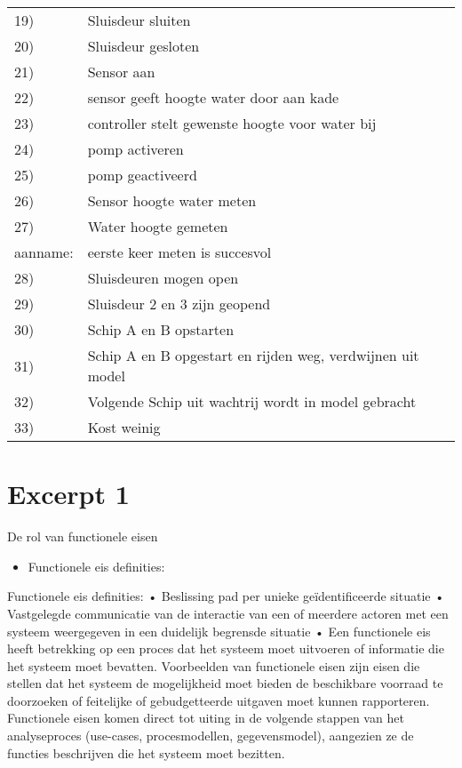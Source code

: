 \documentclass[a4paper,12pt]{article}
\begin{document}
\begin{table}[hbt!]
\begin{center}
\begin{tabular}{llc}
19) & Sluisdeur sluiten & \\
20) & Sluisdeur gesloten & \\
21) & Sensor aan & \\
22) & sensor geeft hoogte water door aan kade & \\
23) & controller stelt gewenste hoogte voor water bij & \\
24) & pomp activeren & \\
25) & pomp geactiveerd & \\
26) & Sensor hoogte water meten & \\
27) & Water hoogte gemeten & \\
aanname: & eerste keer meten is succesvol & \\
28) &  Sluisdeuren mogen open & \\
29) &  Sluisdeur 2 en 3 zijn geopend & \\
30) &  Schip A en B opstarten & \\
31) & Schip A en B opgestart en rijden weg, verdwijnen uit model & \\
32) & Volgende Schip uit wachtrij wordt in model gebracht & \\
33)  & Kost weinig & \\

\hline
\end{tabular}
\end{center}
\end{table}



\clearpage
\newpage
\section{Excerpt 1}
De rol van functionele eisen


\begin{itemize}
  \item Functionele eis definities:

\end{itemize}


Functionele eis definities:
•	Beslissing pad per unieke geïdentificeerde situatie
•	Vastgelegde communicatie van de interactie van een of meerdere actoren met een systeem weergegeven in een duidelijk begrensde situatie
•	Een functionele eis heeft betrekking op een proces dat het systeem moet uitvoeren of informatie die het systeem moet bevatten. Voorbeelden van functionele eisen zijn eisen die stellen dat het systeem de mogelijkheid moet bieden de beschikbare voorraad te doorzoeken of feitelijke of gebudgetteerde uitgaven moet kunnen rapporteren. Functionele eisen komen direct tot uiting in de volgende stappen van het analyseproces (use-cases, procesmodellen, gegevensmodel), aangezien ze de functies beschrijven die het systeem moet bezitten.
\end{document}
